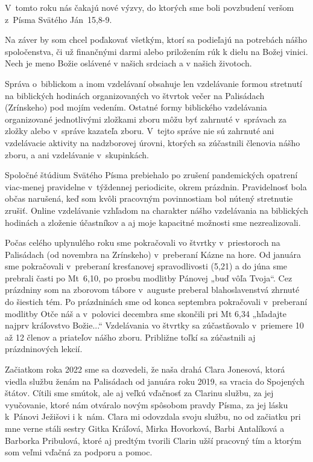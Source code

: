 V~tomto roku nás čakajú nové výzvy, do ktorých sme boli povzbudení veršom z~Písma Svätého Ján~15,8-9.

Na záver by som chcel poďakovať všetkým, ktorí sa podieľajú na potrebách nášho spoločenstva, či už finančnými darmi alebo priložením rúk k dielu na Božej vinici.
Nech je meno Božie oslávené v našich srdciach a v našich životoch.




Správa o~biblickom a inom vzdelávaní obsahuje len vzdelávanie formou stretnutí na biblických hodinách organizovaných vo štvrtok večer na Palisádach (Zrínskeho) pod mojím vedením. Ostatné formy biblického vzdelávania organizované jednotlivými zložkami zboru môžu byť zahrnuté v~správach za zložky alebo v~správe kazateľa zboru. V~tejto správe nie sú zahrnuté ani vzdelávacie aktivity na nadzborovej úrovni, ktorých sa zúčastnili členovia nášho zboru, a ani vzdelávanie v~skupinkách.

Spoločné štúdium Svätého Písma prebiehalo po zrušení pandemických opatrení viac-menej pravidelne v~týždennej periodicite, okrem prázdnin. Pravidelnosť bola občas narušená, keď som kvôli pracovným povinnostiam bol nútený stretnutie zrušiť. Online vzdelávanie vzhľadom na charakter nášho vzdelávania na biblických hodinách a zloženie účastníkov a aj moje kapacitné možnosti sme nezrealizovali.

Počas celého uplynulého roku sme pokračovali vo štvrtky v~priestoroch na Palisádach (od novembra na Zrínskeho) v~preberaní Kázne na hore. Od januára sme pokračovali v~preberaní kresťanovej spravodlivosti (5,21) a do júna sme prebrali časti po Mt~6,10, po prosbu modlitby Pánovej „buď vôľa Tvoja“. Cez prázdniny som na zborovom tábore v~auguste preberal blahoslavenstvá zhrnuté do šiestich tém. Po prázdninách sme od konca septembra pokračovali v~preberaní modlitby Otče náš a v~polovici decembra sme skončili pri Mt 6,34 „hľadajte najprv kráľovstvo Božie...“ Vzdelávania vo štvrtky sa zúčastňovalo v~priemere 10 až 12 členov a priateľov nášho zboru. Približne toľkí sa zúčastnili aj prázdninových lekcií.




Začiatkom roka 2022 sme sa dozvedeli, že naša drahá Clara Jonesová, ktorá viedla službu ženám na Palisádach od januára roku 2019, sa vracia do Spojených štátov. Cítili sme smútok, ale aj veľkú vďačnosť za Clarinu službu, za jej vyučovanie, ktoré nám otváralo novým spôsobom pravdy Písma, za jej lásku k~Pánovi Ježišovi i k~nám.
Clara mi odovzdala svoju službu, no od začiatku pri mne verne stáli sestry Gitka Kráľová, Mirka Hovorková, Barbi Antalíková a Barborka Pribulová, ktoré aj predtým tvorili Clarin užší pracovný tím a ktorým som veľmi vďačná za podporu a pomoc.

